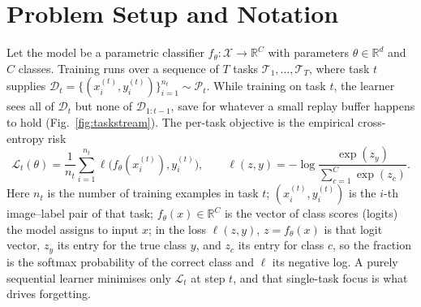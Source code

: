\documentclass[11pt]{article}
\begin{document}
\section{Problem Setup and Notation}
Let the model be a parametric classifier $f_\theta:\mathcal{X}\to
\mathbb{R}^{C}$ with parameters $\theta\in\mathbb{R}^d$ and $C$ classes.
Training runs over a sequence of $T$ tasks
$\mathcal{T}_1,\dots,\mathcal{T}_T$, where task $t$ supplies
$\mathcal{D}_t=\{(x_i^{(t)},y_i^{(t)})\}_{i=1}^{n_t}\sim\mathcal{P}_t$. While
training on task $t$, the learner sees all of $\mathcal{D}_t$ but none of
$\mathcal{D}_{1:t-1}$, save for whatever a small replay buffer happens to hold
(Fig.~\ref{fig:taskstream}). The per-task objective is the empirical
cross-entropy risk
\begin{equation}
\mathcal{L}_t(\theta)=
\frac{1}{n_t}\sum_{i=1}^{n_t}\ell\!\big(f_\theta(x_i^{(t)}),y_i^{(t)}\big),
\qquad
\ell(z,y)=-\log\frac{\exp(z_y)}{\sum_{c=1}^{C}\exp(z_c)} .
\label{eq:ce}
\end{equation}
Here $n_t$ is the number of training examples in task $t$; $(x_i^{(t)},y_i^{(t)})$
is the $i$-th image--label pair of that task; $f_\theta(x)\in\mathbb{R}^{C}$ is
the vector of class scores (logits) the model assigns to input $x$; in the loss
$\ell(z,y)$, $z=f_\theta(x)$ is that logit vector, $z_y$ its entry for the true
class $y$, and $z_c$ its entry for class $c$, so the fraction is the softmax
probability of the correct class and $\ell$ its negative log. A purely sequential
learner minimises only $\mathcal{L}_t$ at step $t$, and that single-task focus is
what drives forgetting.
\end{document}
